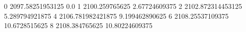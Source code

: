 0 2097.58251953125 0.0
1 2100.259765625 2.67724609375
2 2102.872314453125 5.289794921875
4 2106.781982421875 9.199462890625
6 2108.25537109375 10.6728515625
8 2108.384765625 10.80224609375
